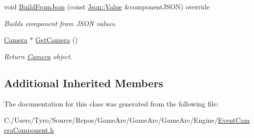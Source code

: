 \begin{DoxyCompactItemize}
\mbox{\label{class_event_camera_component_a47edd4b0e80549fa677b3ff02465e62e}} 
void \mbox{\hyperlink{class_event_camera_component_a47edd4b0e80549fa677b3ff02465e62e}{Build\+From\+Json}} (const \mbox{\hyperlink{class_json_1_1_value}{Json\+::\+Value}} \&component\+J\+S\+ON) override
\begin{DoxyCompactList}\small\item\em Builds component from J\+S\+ON values. \end{DoxyCompactList}\item 
\mbox{\label{class_event_camera_component_ae8ffe14e924fbd153eb2101acf180fed}} 
\mbox{\hyperlink{class_camera}{Camera}} $\ast$ \mbox{\hyperlink{class_event_camera_component_ae8ffe14e924fbd153eb2101acf180fed}{Get\+Camera}} ()
\begin{DoxyCompactList}\small\item\em Return \mbox{\hyperlink{class_camera}{Camera}} object. \end{DoxyCompactList}\end{DoxyCompactItemize}
\subsection*{Additional Inherited Members}


The documentation for this class was generated from the following file\+:\begin{DoxyCompactItemize}
\item 
C\+:/\+Users/\+Tyro/\+Source/\+Repos/\+Game\+Arc/\+Game\+Arc/\+Game\+Arc/\+Engine/\mbox{\hyperlink{_event_camera_component_8h}{Event\+Camera\+Component.\+h}}\end{DoxyCompactItemize}
